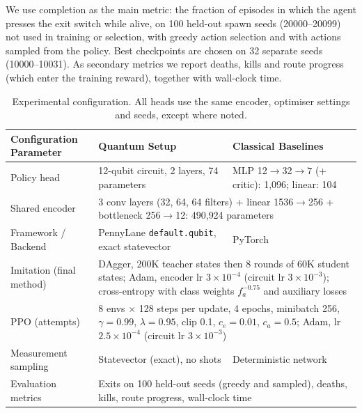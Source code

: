 \documentclass[10pt, a4paper]{article}
\begin{document}
We use completion as the main metric: the fraction of episodes in which the agent presses the exit switch while alive, on 100 held-out spawn seeds (20000--20099) not used in training or selection, with greedy action selection and with actions sampled from the policy. Best checkpoints are chosen on 32 separate seeds (10000--10031). As secondary metrics we report deaths, kills and route progress (which enter the training reward), together with wall-clock time.

\begin{table}[htbp]
\centering
\footnotesize
\renewcommand{\arraystretch}{1.1}
\caption{Experimental configuration. All heads use the same encoder, optimiser settings and seeds, except where noted.}
\label{tab:experimental_setup}
\begin{tabularx}{\textwidth}{lXX}
\toprule
\textbf{Configuration Parameter} & \textbf{Quantum Setup} & \textbf{Classical Baselines} \\
\midrule
Policy head & 12-qubit circuit, 2 layers, 74 parameters & MLP 12$\to$32$\to7$ (+ critic): 1,096; linear: 104 \\
Shared encoder & \multicolumn{2}{p{0.74\textwidth}}{3 conv layers (32, 64, 64 filters) + linear 1536$\to$256 + bottleneck 256$\to$12: 490{,}924 parameters} \\
Framework / Backend & PennyLane \texttt{default.qubit}, exact statevector & PyTorch \\
Imitation (final method) & \multicolumn{2}{p{0.74\textwidth}}{DAgger, 200K teacher states then 8 rounds of 60K student states; Adam, encoder lr $3\times10^{-4}$ (circuit lr $3\times10^{-3}$); cross-entropy with class weights $f_a^{-0.75}$ and auxiliary losses} \\
PPO (attempts) & \multicolumn{2}{p{0.74\textwidth}}{8 envs $\times$ 128 steps per update, 4 epochs, minibatch 256, $\gamma=0.99$, $\lambda=0.95$, clip 0.1, $c_e=0.01$, $c_a=0.5$; Adam, lr $2.5\times10^{-4}$ (circuit lr $3\times10^{-3}$)} \\
Measurement sampling & Statevector (exact), no shots & Deterministic network \\
Evaluation metrics & \multicolumn{2}{p{0.74\textwidth}}{Exits on 100 held-out seeds (greedy and sampled), deaths, kills, route progress, wall-clock time} \\
\bottomrule
\end{tabularx}
\end{table}
\end{document}
